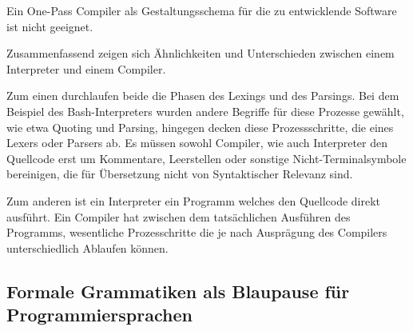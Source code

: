   Ein One-Pass Compiler als Gestaltungsschema für die zu entwicklende Software ist nicht geeignet.
  
Zusammenfassend zeigen sich Ähnlichkeiten und Unterschieden zwischen einem Interpreter und einem Compiler. 

Zum einen durchlaufen beide die Phasen des Lexings und des Parsings. Bei dem Beispiel des Bash-Interpreters wurden andere Begriffe für diese Prozesse gewählt, wie etwa Quoting und Parsing, hingegen decken diese Prozessschritte, die eines Lexers oder Parsers ab. Es müssen sowohl Compiler, wie auch Interpreter den Quellcode erst um Kommentare, Leerstellen oder sonstige Nicht-Terminalsymbole bereinigen, die für Übersetzung nicht von Syntaktischer Relevanz sind. 

Zum anderen ist ein Interpreter ein Programm welches den Quellcode direkt ausführt. Ein Compiler hat zwischen dem tatsächlichen Ausführen des Programms, wesentliche Prozesschritte die je nach Ausprägung des Compilers unterschiedlich Ablaufen können.


   \pagebreak
   
   
	\subsection{Formale Grammatiken als Blaupause für Programmiersprachen}
     
